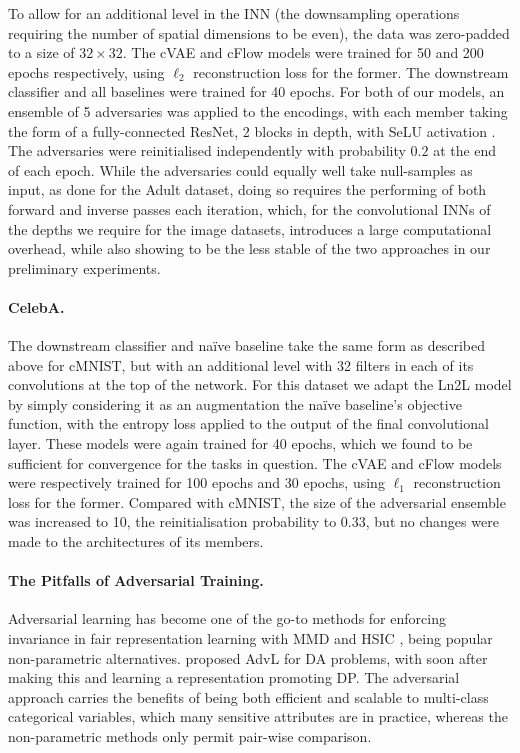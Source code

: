 To allow for an additional level in the \ac{INN} (the downsampling operations requiring the number
of spatial dimensions to be even), the data was zero-padded to a size of $32\times32$. 
%
The \ac{cVAE} and \ac{cFlow} models were trained for 50 and 200 epochs respectively, using $\ell_2$
reconstruction loss for the former. The downstream classifier and all baselines were trained for 40
epochs. 
%
For both of our models, an ensemble of 5 adversaries was applied to the encodings, with each member
taking the form of a fully-connected ResNet, 2 blocks in depth, with SeLU activation
\citep{klambauer2017self}.
%
The adversaries were reinitialised independently with probability $0.2$ at the end of each epoch.
%
While the adversaries could equally well take  null-samples as input, as done for the Adult
dataset, doing so requires the performing of both forward and inverse passes each iteration, which,
for the convolutional \acp{INN} of the depths we require for the image datasets, introduces a large
computational overhead, while also showing to be the less stable of the two approaches in our
preliminary experiments.

\paragraph{CelebA.} The downstream classifier and na\"ive baseline take the same form as described
above for cMNIST, but with an additional level with 32 filters in each of its convolutions at the
top of the network. 
%
For this dataset we adapt the Ln2L model by simply considering it as an augmentation the na\"ive
baseline's objective function, with the entropy loss applied to the output of the final
convolutional layer. 
%
These models were again trained for 40 epochs, which we found to be sufficient for convergence for
the tasks in question. 
%
The \ac{cVAE} and \ac{cFlow} models were respectively trained for 100 epochs and 30 epochs, using $\ell_1$
reconstruction loss for the former. 
%
Compared with cMNIST, the size of the adversarial ensemble was increased to 10, the
reinitialisation probability to 0.33, but no changes were made to the architectures of its members.

\paragraph{The Pitfalls of Adversarial Training.}
%
Adversarial learning has become one of the go-to methods for enforcing invariance in fair
representation learning \citep{ganin2016domain} with \ac{MMD} \citep{louizos2016variational} and HSIC
\citep{QuaShaTho19}, being popular non-parametric alternatives. 
%
\citet{ganin2016domain} proposed \acl{AdvL} for \acf{DA} problems, with
\citet{edwards2016censoring} soon after making this and learning a representation promoting
\ac{DP}. 
%
The adversarial approach carries the benefits of being both efficient and scalable to multi-class
categorical variables, which many sensitive attributes are in practice, whereas the non-parametric
methods only permit pair-wise comparison.

